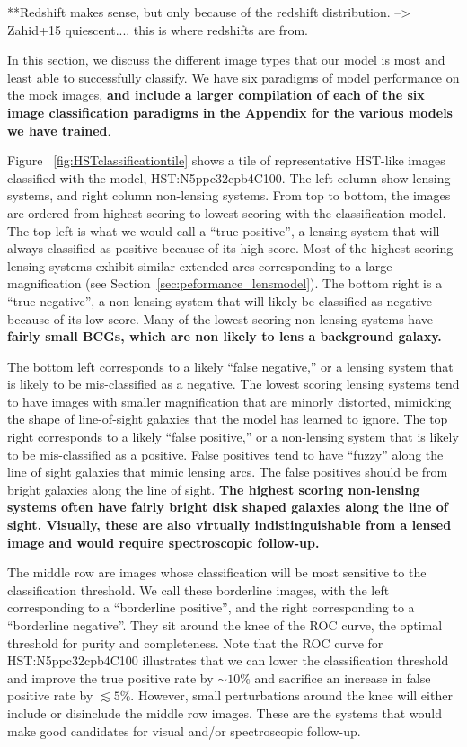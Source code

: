 \documentclass{emulateapj}
\newcommand{\todo}[1]{{\bf\color{blue} #1}}
\def\lsim{\lesssim}
\begin{document}
**Redshift makes sense, but only because of the redshift distribution.
--> Zahid+15 quiescent.... this is where redshifts are from.

In this section, we discuss the different image types that our model
is most and least able to successfully classify.  We have six
paradigms of model performance on the mock images, \todo{and include a
larger compilation of each of the six image classification paradigms
in the Appendix for the various models we have trained}.

Figure ~\ref{fig:HSTclassificationtile} shows a tile of representative
HST-like images classified with the model, HST:N5ppc32cpb4C100.  The
left column show lensing systems, and right column non-lensing
systems.  From top to bottom, the images are ordered from highest
scoring to lowest scoring with the classification model.  The top left
is what we would call a ``true positive'', a lensing system that will
always classified as positive because of its high score.  Most of the
highest scoring lensing systems exhibit similar extended arcs
corresponding to a large magnification (see
Section~\ref{sec:peformance_lensmodel}).  The bottom right is a ``true
negative'', a non-lensing system that will likely be classified as
negative because of its low score.  Many of the lowest scoring
non-lensing systems have \todo{fairly small BCGs, which are non likely
  to lens a background galaxy.}

The bottom left corresponds to a likely ``false negative,'' or a
lensing system that is likely to be mis-classified as a negative.  The
lowest scoring lensing systems tend to have images with smaller
magnification that are minorly distorted, mimicking the shape of
line-of-sight galaxies that the model has learned to ignore.  The top
right corresponds to a likely ``false positive,'' or a non-lensing
system that is likely to be mis-classified as a positive.  False
positives tend to have ``fuzzy'' along the line of sight galaxies that
mimic lensing arcs.  The false positives should be from bright
galaxies along the line of sight.  \todo{The highest scoring
  non-lensing systems often have fairly bright disk shaped galaxies
  along the line of sight.  Visually, these are also virtually
  indistinguishable from a lensed image and would require
  spectroscopic follow-up.}

The middle row are images whose classification will be most sensitive
to the classification threshold.  We call these borderline images,
with the left corresponding to a ``borderline positive'', and the
right corresponding to a ``borderline negative''.  They sit around the
knee of the ROC curve, the optimal threshold for purity and
completeness.  Note that the ROC curve for HST:N5ppc32cpb4C100
illustrates that we can lower the classification threshold and improve
the true positive rate by $\sim10\%$ and sacrifice an increase in
false positive rate by $\lsim5\%$.  However, small perturbations
around the knee will either include or disinclude the middle row
images.  These are the systems that would make good candidates for
visual and/or spectroscopic follow-up.
\end{document}
